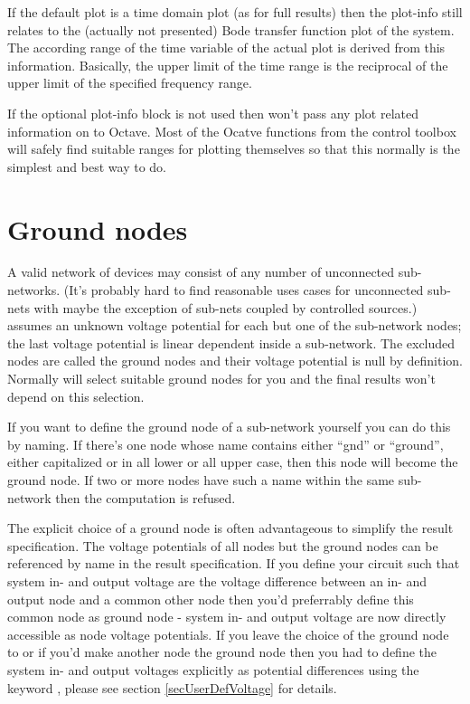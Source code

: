 If the default plot is a time domain plot (as for full results) then the
plot-info still relates to the (actually not presented) Bode transfer
function plot of the system. The according range of the time variable of
the actual plot is derived from this information. Basically, the upper
limit of the time range is the reciprocal of the upper limit of the
specified frequency range.

If the optional plot-info block is not used then \linnet{} won't pass any
plot related information on to Octave. Most of the Ocatve functions from
the control toolbox will safely find suitable ranges for plotting
themselves so that this normally is the simplest and best way to do.


\section{Ground nodes}
\label{secGndNode}

A valid network of devices may consist of any number of unconnected
sub-networks. (It's probably hard to find reasonable uses cases for
unconnected sub-nets with maybe the exception of sub-nets coupled by
controlled sources.) \linnet{} assumes an unknown voltage potential for
each but one of the sub-network nodes; the last voltage potential is
linear dependent inside a sub-network. The excluded nodes are called the
ground nodes and their voltage potential is null by definition. Normally
\linnet{} will select suitable ground nodes for you and the final results
won't depend on this selection.

If you want to define the ground node of a sub-network yourself you can do
this by naming. If there's one node whose name contains either ``gnd'' or
``ground'', either capitalized or in all lower or all upper case, then
this node will become the ground node. If two or more nodes have such a
name within the same sub-network then the computation is refused.

The explicit choice of a ground node is often advantageous to simplify the
result specification. The voltage potentials of all nodes but the ground
nodes can be referenced by name in the result specification. If you define
your circuit such that system in- and output voltage are the voltage
difference between an in- and output node and a common other node then
you'd preferrably define this common node as ground node - system in- and
output voltage are now directly accessible as node voltage potentials. If
you leave the choice of the ground node to \linnet{} or if you'd make
another node the ground node then you had to define the system in- and
output voltages explicitly as potential differences using the keyword
, please see section \ref{secUserDefVoltage} for details.

